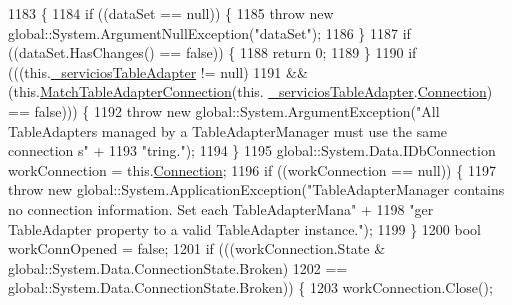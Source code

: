 \begin{DoxyCode}
1183                                                           \{
1184             \textcolor{keywordflow}{if} ((dataSet == null)) \{
1185                 \textcolor{keywordflow}{throw} \textcolor{keyword}{new} global::System.ArgumentNullException(\textcolor{stringliteral}{"dataSet"});
1186             \}
1187             \textcolor{keywordflow}{if} ((dataSet.HasChanges() == \textcolor{keyword}{false})) \{
1188                 \textcolor{keywordflow}{return} 0;
1189             \}
1190             \textcolor{keywordflow}{if} (((this.\hyperlink{class_proyecto___integrador__3_1_1ds_servicios_table_adapters_1_1_table_adapter_manager_ac26b431a74f60f4ba1f8cc57cb5e75e2}{\_serviciosTableAdapter} != null) 
1191                         && (this.\hyperlink{class_proyecto___integrador__3_1_1ds_servicios_table_adapters_1_1_table_adapter_manager_a4ae64aa35a512fc0489b4806bf32e8de}{MatchTableAdapterConnection}(this.
      \hyperlink{class_proyecto___integrador__3_1_1ds_servicios_table_adapters_1_1_table_adapter_manager_ac26b431a74f60f4ba1f8cc57cb5e75e2}{\_serviciosTableAdapter}.\hyperlink{class_proyecto___integrador__3_1_1ds_servicios_table_adapters_1_1_servicios_table_adapter_afdc3759c0f8fd84ed6ae2943ee4855f5}{Connection}) == \textcolor{keyword}{false}))) \{
1192                 \textcolor{keywordflow}{throw} \textcolor{keyword}{new} global::System.ArgumentException(\textcolor{stringliteral}{"All TableAdapters managed by a
       TableAdapterManager must use the same connection s"} +
1193                         \textcolor{stringliteral}{"tring."});
1194             \}
1195             global::System.Data.IDbConnection workConnection = this.\hyperlink{class_proyecto___integrador__3_1_1ds_servicios_table_adapters_1_1_table_adapter_manager_aa28c9a2ec84db34bcba3dda82809b04b}{Connection};
1196             \textcolor{keywordflow}{if} ((workConnection == null)) \{
1197                 \textcolor{keywordflow}{throw} \textcolor{keyword}{new} global::System.ApplicationException(\textcolor{stringliteral}{"TableAdapterManager contains no connection
       information. Set each TableAdapterMana"} +
1198                         \textcolor{stringliteral}{"ger TableAdapter property to a valid TableAdapter instance."});
1199             \}
1200             \textcolor{keywordtype}{bool} workConnOpened = \textcolor{keyword}{false};
1201             \textcolor{keywordflow}{if} (((workConnection.State & global::System.Data.ConnectionState.Broken) 
1202                         == global::System.Data.ConnectionState.Broken)) \{
1203                 workConnection.Close();

\end{DoxyCode}
